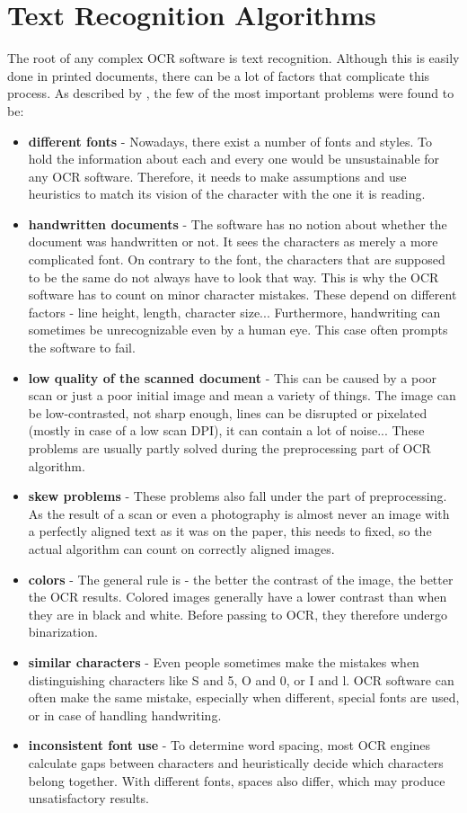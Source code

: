 \chapter{Text Recognition Algorithms}

The root of any complex OCR software is text recognition.
Although this is easily done in printed documents, there can be a lot of factors that complicate this process. As described by  \citet{preprocessAll}, the few of the most important problems were found to be:

\begin{itemize}
\item\textbf{different fonts} - Nowadays, there exist a number of fonts and styles. To hold the information about each and every one would be unsustainable for any OCR software. Therefore, it needs to make assumptions and use heuristics to match its vision of the character with the one it is reading.
\item\textbf {handwritten documents} - The software has no notion about whether the document was handwritten or not. It sees the characters as merely a more complicated font. On contrary to the font, the characters that are supposed to be the same do not always have to look that way. This is why the OCR software has to count on minor character mistakes. These depend on different factors - line height, length, character size... Furthermore, handwriting can sometimes be unrecognizable even by a human eye. This case often prompts the software to fail.
\item\textbf {low quality of the scanned document} - This can be caused by a poor scan or just a poor initial image and mean a variety of things. The image can be low-contrasted, not sharp enough, lines can be disrupted or pixelated (mostly in case of a low scan DPI), it can contain a lot of noise... These problems are usually partly solved during the preprocessing part of OCR algorithm.
\item\textbf {skew problems} - These problems also fall under the part of preprocessing. As the result of a scan or even a photography is almost never an image with a perfectly aligned text as it was on the paper, this needs to fixed, so the actual algorithm can count on correctly aligned images.
\item\textbf {colors} - The general rule is - the better the contrast of the image, the better the OCR results. Colored images generally have a lower contrast than when they are in black and white. Before passing to OCR, they therefore undergo binarization.
\item\textbf {similar characters} - Even people sometimes make the mistakes when distinguishing characters like S and 5, O and 0, or I and l. OCR software can often make the same mistake, especially when different, special fonts are used, or in case of handling handwriting.
\item\textbf {inconsistent font use} - To determine word spacing, most OCR engines calculate gaps between characters and heuristically decide which characters belong together. With different fonts, spaces also differ, which may produce unsatisfactory results.
\end{itemize}

